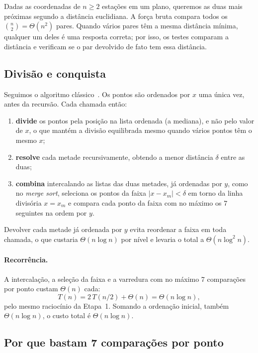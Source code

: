 \documentclass[11pt,a4paper]{article}
\begin{document}
Dadas as coordenadas de $n \geq 2$ estações em um plano, queremos as duas mais próximas segundo a distância euclidiana. A força bruta compara todos os $\binom{n}{2} = \Theta(n^2)$ pares. Quando vários pares têm a mesma distância mínima, qualquer um deles é uma resposta correta; por isso, os testes comparam a distância e verificam se o par devolvido de fato tem essa distância.

\subsection{Divisão e conquista}

Seguimos o algoritmo clássico~\cite{clrs,kt}. Os pontos são ordenados por $x$ uma única vez, antes da recursão. Cada chamada então:

\begin{enumerate}
  \item \textbf{divide} os pontos pela posição na lista ordenada (a mediana), e não pelo valor de $x$, o que mantém a divisão equilibrada mesmo quando vários pontos têm o mesmo $x$;
  \item \textbf{resolve} cada metade recursivamente, obtendo a menor distância $\delta$ entre as duas;
  \item \textbf{combina} intercalando as listas das duas metades, já ordenadas por $y$, como no \emph{merge sort}, seleciona os pontos da faixa $|x - x_m| < \delta$ em torno da linha divisória $x = x_m$ e compara cada ponto da faixa com no máximo os 7 seguintes na ordem por $y$.
\end{enumerate}

Devolver cada metade já ordenada por $y$ evita reordenar a faixa em toda chamada, o que custaria $\Theta(n\log n)$ por nível e levaria o total a $\Theta(n\log^2 n)$.

\paragraph{Recorrência.} A intercalação, a seleção da faixa e a varredura com no máximo 7 comparações por ponto custam $\Theta(n)$ cada:
\[
T(n) = 2\,T(n/2) + \Theta(n) = \Theta(n\log n),
\]
pelo mesmo raciocínio da Etapa~1. Somando a ordenação inicial, também $\Theta(n\log n)$, o custo total é $\Theta(n\log n)$.

\subsection{Por que bastam 7 comparações por ponto}
\end{document}

